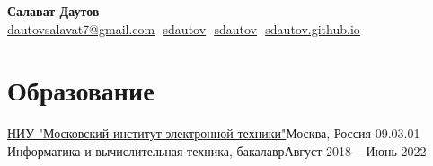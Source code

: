 \documentclass{resume}
\begin{document}
\begin{center}
  \textbf{\Large Салават Даутов} \\
  \vspace{4pt}
  \small
  \href{mailto:dautovsalavatd@gmail.com}{\underline{dautovsalavat7@gmail.com}} $ $
  \href{https://t.me/sdautov}{\underline{sdautov}} $ $
  \href{https://github.com/sdautov}{\underline{sdautov}} $ $
  \href{https://sdautov.github.io}{\underline{sdautov.github.io}}
\end{center}

\section{Образование}
\resumeSubHeadingListStart
\resumeSubheading
{\href{https://www.miet.ru/}{НИУ "Московский институт электронной техники"}}{Москва, Россия}
{09.03.01 Информатика и вычислительная техника, бакалавр}{Август 2018 -- Июнь 2022}
\resumeSubHeadingListEnd

\end{document}
